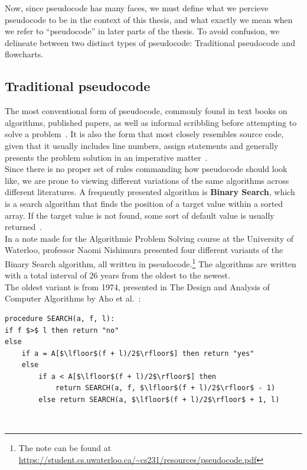 Now, since pseudocode has many faces, we must define what we percieve pseudocode to be in the context of this thesis, and what exactly we mean when we refer to ``pseudocode'' in later parts of the thesis. To avoid confusion, we delineate between two distinct types of pseudocode: Traditional pseudocode and flowcharts.

\subsection{Traditional pseudocode}

The most conventional form of pseudocode, commonly found in text books on algorithms, published papers, as well as informal scribbling before attempting to solve a problem~\cite{payAttentionToMLPs, BOOK:intro/Cormen/Leiserson}. It is also the form that most closely resembles source code, given that it usually includes line numbers, assign statements and generally presents the problem solution in an imperative matter~\cite{proposalForParadigmGeneralPseudocode}. \hfill \\

Since there is no proper set of rules commanding how pseudocode should look like, we are prone to viewing different variations of the same algorithms across different literatures. A frequently presented algorithm is \textbf{Binary Search}, which is a search algorithm that finds the position of a target value within a sorted array. If the target value is not found, some sort of default value is usually returned~\cite{BOOK:intro/Cormen/Leiserson}. \hfill \\

In a note made for the Algorithmic Problem Solving course at the University of Waterloo, professor Naomi Nishimura presented four different variants of the Binary Search algorithm, all written in pseudocode.\footnote{The note can be found at \url{https://student.cs.uwaterloo.ca/~cs231/resources/pseudocode.pdf}} The algorithms are written with a total interval of 26 years from the oldest to the newest. \hfill \\

The oldest variant is from 1974, presented in The Design and Analysis of Computer Algorithms by Aho et al.~\cite[139]{BOOK:DesignAnalysis/Aho}: \hfill \\

\begin{lstlisting}
procedure SEARCH(a, f, l):
if f $>$ l then return "no"
else
    if a = A[$\lfloor$(f + l)/2$\rfloor$] then return "yes"
    else
        if a < A[$\lfloor$(f + l)/2$\rfloor$] then
            return SEARCH(a, f, $\lfloor$(f + l)/2$\rfloor$ - 1)
        else return SEARCH(a, $\lfloor$(f + l)/2$\rfloor$ + 1, l)
\end{lstlisting} \hfill \\

